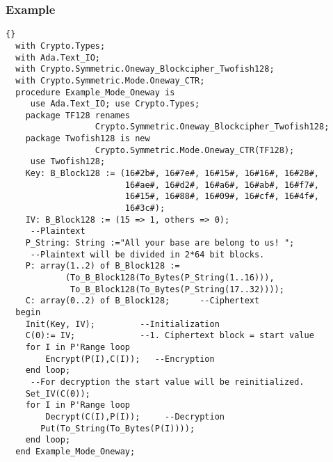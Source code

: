 \subsubsection*{Example}
\begin{lstlisting}{}
  with Crypto.Types;
  with Ada.Text_IO;
  with Crypto.Symmetric.Oneway_Blockcipher_Twofish128;
  with Crypto.Symmetric.Mode.Oneway_CTR;
  procedure Example_Mode_Oneway is
	 use Ada.Text_IO; use Crypto.Types;
    package TF128 renames 
                  Crypto.Symmetric.Oneway_Blockcipher_Twofish128;
    package Twofish128 is new
                  Crypto.Symmetric.Mode.Oneway_CTR(TF128);
 	 use Twofish128;
    Key: B_Block128 := (16#2b#, 16#7e#, 16#15#, 16#16#, 16#28#,
                        16#ae#, 16#d2#, 16#a6#, 16#ab#, 16#f7#,
                        16#15#, 16#88#, 16#09#, 16#cf#, 16#4f#,
                        16#3c#);
    IV: B_Block128 := (15 => 1, others => 0);
     --Plaintext
    P_String: String :="All your base are belong to us! ";
     --Plaintext will be divided in 2*64 bit blocks.
    P: array(1..2) of B_Block128 := 
			(To_B_Block128(To_Bytes(P_String(1..16))),
			 To_B_Block128(To_Bytes(P_String(17..32))));
    C: array(0..2) of B_Block128;      --Ciphertext
  begin
    Init(Key, IV);         --Initialization
    C(0):= IV;             --1. Ciphertext block = start value
    for I in P'Range loop
	    Encrypt(P(I),C(I));   --Encryption
    end loop;
     --For decryption the start value will be reinitialized.
    Set_IV(C(0));
    for I in P'Range loop
	    Decrypt(C(I),P(I));     --Decryption
       Put(To_String(To_Bytes(P(I))));
    end loop;
  end Example_Mode_Oneway;
\end{lstlisting}
